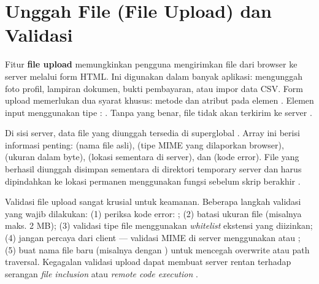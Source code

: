 \section{Unggah File (File Upload) dan Validasi}

Fitur \textbf{file upload} memungkinkan pengguna mengirimkan file dari browser ke server melalui form HTML. Ini digunakan dalam banyak aplikasi: mengunggah foto profil, lampiran dokumen, bukti pembayaran, atau impor data CSV. Form upload memerlukan dua syarat khusus: metode  dan atribut  pada elemen . Elemen input menggunakan tipe : . Tanpa  yang benar, file tidak akan terkirim ke server \cite{phpManual}.

Di sisi server, data file yang diunggah tersedia di superglobal . Array ini berisi informasi penting:  (nama file asli),  (tipe MIME yang dilaporkan browser),  (ukuran dalam byte),  (lokasi sementara di server), dan  (kode error). File yang berhasil diunggah disimpan sementara di direktori temporary server dan harus dipindahkan ke lokasi permanen menggunakan fungsi  sebelum skrip berakhir \cite{phpRightWay}.

Validasi file upload sangat krusial untuk keamanan. Beberapa langkah validasi yang wajib dilakukan: (1) periksa kode error: ; (2) batasi ukuran file (misalnya maks. 2 MB); (3) validasi tipe file menggunakan \textit{whitelist} ekstensi yang diizinkan; (4) jangan percaya  dari client --- validasi MIME di server menggunakan  atau ; (5) buat nama file baru (misalnya dengan ) untuk mencegah overwrite atau path traversal. Kegagalan validasi upload dapat membuat server rentan terhadap serangan \textit{file inclusion} atau \textit{remote code execution} \cite{owaspXss}.

